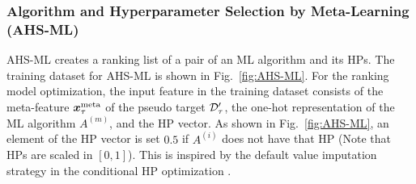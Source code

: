 

\subsubsection{Algorithm and Hyperparameter Selection by Meta-Learning (AHS-ML)}
\label{ssapp:AHS-ML}


AHS-ML creates a ranking list of a pair of an ML algorithm and its HPs.
%
The training dataset for AHS-ML is shown in Fig.~\ref{fig:AHS-ML}.
%
%
%
%
For the ranking model optimization, the input feature in the training dataset consists of the meta-feature 
$\boldsymbol{x}_\tau^{\rm meta}$
of the pseudo target
${\mathcal D}_\tau^\prime$, 
the one-hot representation of the ML algorithm 
$A^{(m)}$, 
and the HP vector.
%
As shown in Fig.~\ref{fig:AHS-ML}, an element of the HP vector is set $0.5$ if $A^{(i)}$ does not have that HP (Note that HPs are scaled in $[0,1]$).
%
This is inspired by the default value imputation strategy in the conditional HP optimization \cite{levesque2017bayesian}.
%
